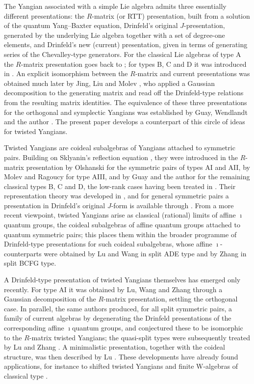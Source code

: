 \documentclass{amsart}
\numberwithin{equation}{section}
\theoremstyle{remark}
\renewcommand{\,}{\kern 0.1em} %
\begin{document}
The Yangian associated with a simple Lie algebra admits three essentially different presentations: the $R$-matrix (or RTT) presentation, built from a solution of the quantum Yang--Baxter equation, Drinfeld's original $J$-presentation, generated by the underlying Lie algebra together with a set of degree-one elements, and Drinfeld's new (current) presentation, given in terms of generating series of the Chevalley-type generators. For the classical Lie algebras of type A the $R$-matrix presentation goes back to \cite{MNO96}; for types B, C and D it was introduced in \cite{AMR06, Mo07}. An explicit isomorphism between the $R$-matrix and current presentations was obtained much later by Jing, Liu and Molev \cite{JLM18}, who applied a Gaussian decomposition to the generating matrix and read off the Drinfeld-type relations from the resulting matrix identities. 
The equivalence of these three presentations for the orthogonal and symplectic Yangians was established by Guay, Wendlandt and the author \cite{GRW19b}.
The present paper develops a counterpart of this circle of ideas for twisted Yangians.

Twisted Yangians are coideal subalgebras of Yangians attached to symmetric pairs. Building on Sklyanin's reflection equation \cite{Sk88}, they were introduced in the $R$-matrix presentation by Olshanski \cite{Ol92} for the symmetric pairs of types AI and AII, by Molev and Ragoucy \cite{MR02} for type AIII, and by Guay and the author \cite{GR16} for the remaining classical types B, C and D, the low-rank cases having been treated in \cite{GRW16}. Their representation theory was developed in \cite{MNO96, Mo07, GRW18, GRW19a}, and for general symmetric pairs a presentation in Drinfeld's original $J$-form is available through \cite{Ma02, BR17}. From a more recent viewpoint, twisted Yangians arise as classical (rational) limits of affine $\imath$quantum groups, the coideal subalgebras of affine quantum groups attached to quantum symmetric pairs; this places them within the broader programme of Drinfeld-type presentations for such coideal subalgebras, whose affine $\imath$-counterparts were obtained by Lu and Wang \cite{LW21} in split ADE type and by Zhang \cite{Zh22} in split BCFG type.

A Drinfeld-type presentation of twisted Yangians themselves has emerged only recently. For type AI it was obtained by Lu, Wang and Zhang \cite{LWZ25a} through a Gaussian decomposition of the $R$-matrix presentation, settling the orthogonal case. In parallel, the same authors \cite{LWZ25b} produced, for all split symmetric pairs, a family of current algebras by degenerating the Drinfeld presentations of the corresponding affine $\imath$quantum groups, and conjectured these to be isomorphic to the $R$-matrix twisted Yangians; the quasi-split types were subsequently treated by Lu and Zhang \cite{LZ25}. A minimalistic presentation, together with the coideal structure, was then described by Lu \cite{Lu26a}. These developments have already found applications, for instance to shifted twisted Yangians and finite W-algebras of classical type \cite{LPTTW25}.
\end{document}
